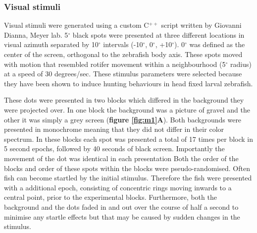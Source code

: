 \subsubsection{Visual stimuli}
Visual stimuli were generated using a custom C$^{++}$ script written by Giovanni Dianna, Meyer lab.  5$^{\circ}$ black spots were presented at three different locations in visual azimuth separated by 10$^{\circ}$ intervals (-10$^{\circ}$, 0$^{\circ}$, +10$^{\circ}$). 0$^{\circ}$ was defined as the center of the screen, orthogonal to the zebrafish body axis. These spots moved with motion that resembled rotifer movement within a neighbourhood (5$^{\circ}$ radius) at a speed of 30 degrees/sec. These stimulus parameters were selected because they have been shown to induce hunting behaviours in head fixed larval zebrafish.

These dots were presented in two blocks which differed in the background they were projected over. In one block the background was a picture of gravel and the other it was simply a grey screen (\textbf{figure \ref{fig:m1}A}). Both backgrounds were presented in monochrome meaning that they did not differ in their color spectrum. In these blocks each spot was presented a total of 17 times per block in 5 second epochs, followed by 40 seconds of black screen. Importantly the movement of the dot was identical in each presentation Both the order of the blocks and order of these spots within the blocks were pseudo-randomised. Often fish can become startled by the initial stimulus. Therefore the fish were presented with a additional epoch, consisting of concentric rings moving inwards to a central point, prior to the experimental blocks. Furthermore, both the background and the dots faded in and out over the course of half a second to minimise any startle effects but that may be caused by sudden changes in the stimulus.


